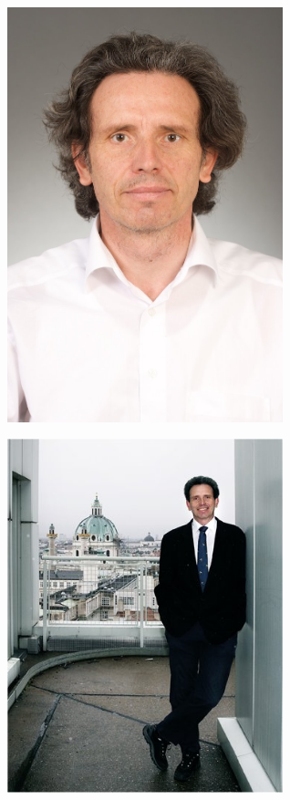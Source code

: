 \documentclass[11pt,a4paper]{moderncv}
\begin{document}
\begin{center}
\includegraphics[width=0.6\textwidth]{2012-portrait1.jpg} \\
\end{center}
\begin{center}
\includegraphics[width=0.6\textwidth]{2012-portrait2.jpg} \\
\end{center}
\end{document}
